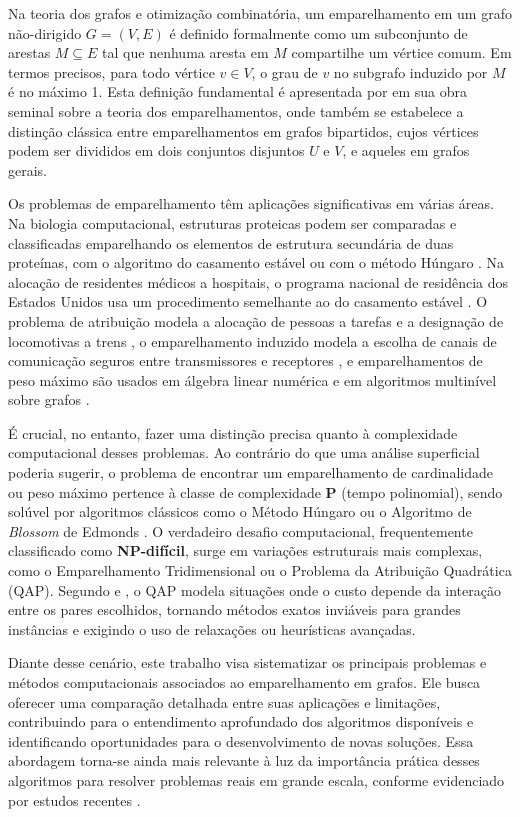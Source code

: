 Na teoria dos grafos e otimização combinatória, um emparelhamento em um grafo não-dirigido $G=(V, E)$ é definido formalmente como um subconjunto de arestas $M \subseteq E$ tal que nenhuma aresta em $M$ compartilhe um vértice comum. Em termos precisos, para todo vértice $v \in V$, o grau de $v$ no subgrafo induzido por $M$ é no máximo 1. Esta definição fundamental é apresentada por  em sua obra seminal sobre a teoria dos emparelhamentos, onde também se estabelece a distinção clássica entre emparelhamentos em grafos bipartidos, cujos vértices podem ser divididos em dois conjuntos disjuntos $U$ e $V$, e aqueles em grafos gerais.

Os problemas de emparelhamento têm aplicações significativas em várias áreas. Na biologia computacional, estruturas proteicas podem ser comparadas e classificadas emparelhando os elementos de estrutura secundária de duas proteínas, com o algoritmo do casamento estável ou com o método Húngaro \cite{Taylor2002}. Na alocação de residentes médicos a hospitais, o programa nacional de residência dos Estados Unidos usa um procedimento semelhante ao do casamento estável \cite{kleinberg}. O problema de atribuição modela a alocação de pessoas a tarefas e a designação de locomotivas a trens \cite{burkard}, o emparelhamento induzido modela a escolha de canais de comunicação seguros entre transmissores e receptores \cite{golumbic-lewenstein}, e emparelhamentos de peso máximo são usados em álgebra linear numérica e em algoritmos multinível sobre grafos \cite{matching_gpus_sc24}.

É crucial, no entanto, fazer uma distinção precisa quanto à complexidade computacional desses problemas. Ao contrário do que uma análise superficial poderia sugerir, o problema de encontrar um emparelhamento de cardinalidade ou peso máximo pertence à classe de complexidade \textbf{P} (tempo polinomial), sendo solúvel por algoritmos clássicos como o Método Húngaro ou o Algoritmo de \textit{Blossom} de Edmonds \cite{schrijver}. O verdadeiro desafio computacional, frequentemente classificado como \textbf{NP-difícil}, surge em variações estruturais mais complexas, como o Emparelhamento Tridimensional ou o Problema da Atribuição Quadrática (QAP). Segundo  e , o QAP modela situações onde o custo depende da interação entre os pares escolhidos, tornando métodos exatos inviáveis para grandes instâncias e exigindo o uso de relaxações ou heurísticas avançadas.

Diante desse cenário, este trabalho visa sistematizar os principais problemas e métodos computacionais associados ao emparelhamento em grafos. Ele busca oferecer uma comparação detalhada entre suas aplicações e limitações, contribuindo para o entendimento aprofundado dos algoritmos disponíveis e identificando oportunidades para o desenvolvimento de novas soluções. Essa abordagem torna-se ainda mais relevante à luz da importância prática desses algoritmos para resolver problemas reais em grande escala, conforme evidenciado por estudos recentes \cite{matching_gpus_sc24}.

